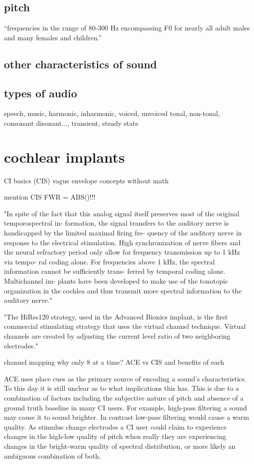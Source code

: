 \documentclass [11pt, proquest] {uwthesis}[2015/03/03]
\begin{document}
\subsection{pitch}

``frequencies in the range of 80-300 Hz encompassing F0 for nearly all adult males and many females and children.''

\subsection{other characteristics of sound}

\subsection{types of audio}
speech, music, harmonic, inharmonic, voiced, unvoiced
tonal, non-tonal, consonant disonant..., transient, steady state


\section{cochlear implants}
CI basics (CIS)
vague envelope concepts without math

mention CIS FWR = ABS()!!!

"In spite of the fact that this analog signal itself preserves most of the original temporospectral in- formation, the signal transfers to the auditory nerve is handicapped by the limited maximal firing fre- quency of the auditory nerve in response to the electrical stimulation. High synchronization of nerve fibers and the neural refractory period only allow for frequency transmission up to 1 kHz via tempo- ral coding alone. For frequencies above 1 kHz, the spectral information cannot be sufficiently trans- ferred by temporal coding alone. Multichannel im- plants have been developed to make use of the tonotopic organization in the cochlea and thus transmit more spectral information to the auditory nerve." \cite{somek2006coding}


"The HiRes120 strategy, used in the Advanced Bionics implant, is the first commercial stimulating strategy that uses the virtual channel technique. Virtual channels are created by adjusting the current level ratio of two neighboring electrodes."

channel mapping
    why only 8 at a time?
    ACE vs CIS and benefits of each
    
    
    
    ACE uses place cues as the primary source of encoding a sound's characteristics.  To this day it is still unclear as to what implications this has.  This is due to a combination of factors including the subjective nature of pitch and absence of a ground truth baseline in many CI users.  For example, high-pass filtering a sound may cause it to sound brighter.  In contrast low-pass filtering would cause a warm quality.  As stimulus change electrodes a CI user could claim to experience changes in the high-low quality of pitch when really they are experiencing changes in the bright-warm quality of spectral distribution, or more likely an ambiguous combination of both.
\end{document}
